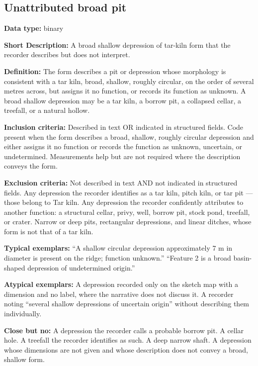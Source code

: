 \documentclass[
]{article}
\begin{document}
\subsection{Unattributed broad pit}\label{unattributed-broad-pit}

\textbf{Data type:} binary

\textbf{Short Description:} A broad shallow depression of tar-kiln form
that the recorder describes but does not interpret.

\textbf{Definition:} The form describes a pit or depression whose
morphology is consistent with a tar kiln, broad, shallow, roughly
circular, on the order of several metres across, but assigns it no
function, or records its function as unknown. A broad shallow depression
may be a tar kiln, a borrow pit, a collapsed cellar, a treefall, or a
natural hollow.

\textbf{Inclusion criteria:} Described in text OR indicated in
structured fields. Code present when the form describes a broad,
shallow, roughly circular depression and either assigns it no function
or records the function as unknown, uncertain, or undetermined.
Measurements help but are not required where the description conveys the
form.

\textbf{Exclusion criteria:} Not described in text AND not indicated in
structured fields. Any depression the recorder identifies as a tar kiln,
pitch kiln, or tar pit --- those belong to Tar kiln. Any depression the
recorder confidently attributes to another function: a structural
cellar, privy, well, borrow pit, stock pond, treefall, or crater. Narrow
or deep pits, rectangular depressions, and linear ditches, whose form is
not that of a tar kiln.

\textbf{Typical exemplars:} ``A shallow circular depression
approximately 7 m in diameter is present on the ridge; function
unknown.'' ``Feature 2 is a broad basin-shaped depression of
undetermined origin.''

\textbf{Atypical exemplars:} A depression recorded only on the sketch
map with a dimension and no label, where the narrative does not discuss
it. A recorder noting ``several shallow depressions of uncertain
origin'' without describing them individually.

\textbf{Close but no:} A depression the recorder calls a probable borrow
pit. A cellar hole. A treefall the recorder identifies as such. A deep
narrow shaft. A depression whose dimensions are not given and whose
description does not convey a broad, shallow form.
\end{document}
